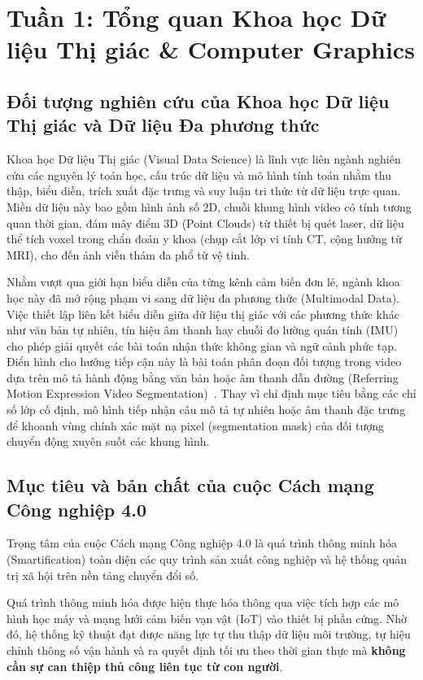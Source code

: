 \section{Tuần 1: Tổng quan Khoa học Dữ liệu Thị giác \& Computer Graphics}
\label{sec:week1}

\subsection{Đối tượng nghiên cứu của Khoa học Dữ liệu Thị giác và Dữ liệu Đa phương thức}

Khoa học Dữ liệu Thị giác (Visual Data Science) là lĩnh vực liên ngành nghiên cứu các nguyên lý toán học, cấu trúc dữ liệu và mô hình tính toán nhằm thu thập, biểu diễn, trích xuất đặc trưng và suy luận tri thức từ dữ liệu trực quan. Miền dữ liệu này bao gồm hình ảnh số 2D, chuỗi khung hình video có tính tương quan thời gian, đám mây điểm 3D (Point Clouds) từ thiết bị quét laser, dữ liệu thể tích voxel trong chẩn đoán y khoa (chụp cắt lớp vi tính CT, cộng hưởng từ MRI), cho đến ảnh viễn thám đa phổ từ vệ tinh.

Nhằm vượt qua giới hạn biểu diễn của từng kênh cảm biến đơn lẻ, ngành khoa học này đã mở rộng phạm vi sang dữ liệu đa phương thức (Multimodal Data). Việc thiết lập liên kết biểu diễn giữa dữ liệu thị giác với các phương thức khác như văn bản tự nhiên, tín hiệu âm thanh hay chuỗi đo lường quán tính (IMU) cho phép giải quyết các bài toán nhận thức không gian và ngữ cảnh phức tạp. Điển hình cho hướng tiếp cận này là bài toán phân đoạn đối tượng trong video dựa trên mô tả hành động bằng văn bản hoặc âm thanh dẫn đường (Referring Motion Expression Video Segmentation)~\citep{week1_MeViS}. Thay vì chỉ định mục tiêu bằng các chỉ số lớp cố định, mô hình tiếp nhận câu mô tả tự nhiên hoặc âm thanh đặc trưng để khoanh vùng chính xác mặt nạ pixel (segmentation mask) của đối tượng chuyển động xuyên suốt các khung hình.

\subsection{Mục tiêu và bản chất của cuộc Cách mạng Công nghiệp 4.0}

Trọng tâm của cuộc Cách mạng Công nghiệp 4.0 là quá trình thông minh hóa (Smartification) toàn diện các quy trình sản xuất công nghiệp và hệ thống quản trị xã hội trên nền tảng chuyển đổi số.

Quá trình thông minh hóa được hiện thực hóa thông qua việc tích hợp các mô hình học máy và mạng lưới cảm biến vạn vật (IoT) vào thiết bị phần cứng. Nhờ đó, hệ thống kỹ thuật đạt được năng lực tự thu thập dữ liệu môi trường, tự hiệu chỉnh thông số vận hành và ra quyết định tối ưu theo thời gian thực mà \textbf{không cần sự can thiệp thủ công liên tục từ con người}.

